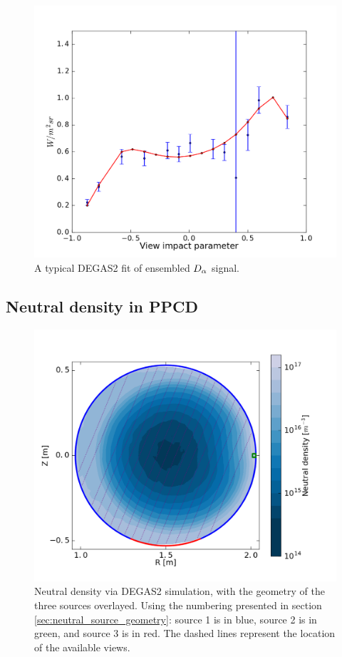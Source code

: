 \begin{figure}
    \centering
    \includegraphics{ion_transport_results/DEGAS2_typical_fit.png}
    \caption{A typical DEGAS2 fit of ensembled $D_{\alpha}$ signal.}
    \label{fig:DEGAS2_typical_fit}
\end{figure}

\subsection{Neutral density in PPCD}

\begin{figure}
    \centering
    \includegraphics{ion_transport_results/DEGAS2_density2d.png}
    \caption[Neutral density via DEGAS2]{Neutral density via DEGAS2 simulation, with the geometry of the three sources overlayed. Using the numbering presented in section \ref{sec:neutral_source_geometry}: source 1 is in blue, source 2 is in green, and source 3 is in red. The dashed lines represent the location of the available views.}
    \label{fig:DEGAS2_sources_and_density}
\end{figure}

